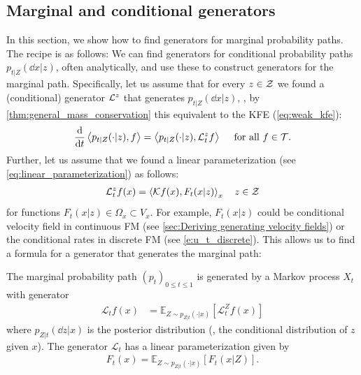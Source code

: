 \documentclass{fairmeta}
\numberwithin{equation}{section}
\begin{document}
\subsection{Marginal and conditional generators}
In this section, we show how to find generators for marginal probability paths. The recipe is as follows: We can find generators for conditional probability paths $p_{t|Z}(\dd x|z)$, often analytically, and use these to construct generators for the marginal path. Specifically, let us assume that for every $z\in {\mathcal{Z}}$ we found a (conditional) generator ${\mathcal{L}}^z$ that generates $p_{t|Z}(\dd x|z)$, \ie, by \cref{thm:general_mass_conservation} this equivalent to the KFE (\cref{eq:weak_kfe}):
\begin{align}
\frac{\mathrm{d}}{\mathrm{d} t} \left \langle p_{t|Z}(\cdot|z), f\right \rangle = \left \langle p_{t|Z}(\cdot|z), {\mathcal{L}}_t^z f\right \rangle\quad \text{ for all }f\in\mathcal{T}.
\end{align}
Further, let us assume that we found a linear parameterization (see \cref{eq:linear_parameterization}) as follows: 
\begin{align}
\label{eq:cond_linear_parameterization}
    \mathcal{L}_t^z f(x) = 
\left \langle \mathcal{K}f(x),F_t(x|z) \right \rangle_{x}\quad z\in {\mathcal{Z}}
\end{align}
for functions $F_t(x|z)\in \Omega_{x}\subset V_{x}$. For example, $F_t(x|z)$ could be conditional velocity field in continuous FM (see \cref{sec:Deriving generating velocity fields}) or the conditional rates in discrete FM (see \cref{e:u_t_discrete}). This allows us to find a formula for a generator that generates the marginal path:
\begin{myframe}
\begin{theorem}
\label{thm:marginal_generator}
The marginal probability path $(p_t)_{0\leq t \leq 1}$ is generated by a Markov process $X_t$ with generator
\begin{align}
\label{eq:marginal_generator_equation}
\mathcal{L}_tf(x) &=\mathbb{E}_{Z\sim p_{Z|t}(\cdot|x)}[\mathcal{L}_t^Zf(x)]
\end{align}
where $p_{Z|t}(\dd z|x)$ is the posterior distribution (\ie, the conditional distribution of $z$ given  $x$). The generator $\mathcal{L}_t$ has a linear parameterization given by
\begin{align}
\label{eq:marginal_generator_equation_linear_parameterization}
F_t(x)=\mathbb{E}_{Z\sim p_{Z|t}(\cdot|x)}[F_t(x|Z)].
\end{align}
\end{theorem}    
\end{myframe}
\end{document}
